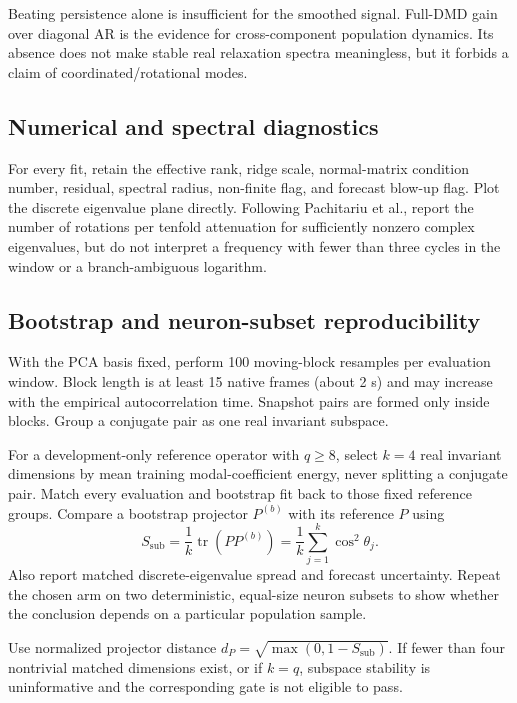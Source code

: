 \documentclass[11pt,a4paper]{article}
\DeclareMathOperator{\tr}{tr}
\begin{document}
Beating persistence alone is insufficient for the smoothed signal. Full-DMD gain
over diagonal AR is the evidence for cross-component population dynamics. Its
absence does not make stable real relaxation spectra meaningless, but it forbids
a claim of coordinated/rotational modes.

\subsection{Numerical and spectral diagnostics}

For every fit, retain the effective rank, ridge scale, normal-matrix condition
number, residual, spectral radius, non-finite flag, and forecast blow-up flag.
Plot the discrete eigenvalue plane directly. Following Pachitariu et al., report
the number of rotations per tenfold attenuation for sufficiently nonzero complex
eigenvalues, but do not interpret a frequency with fewer than three cycles in the
window or a branch-ambiguous logarithm.

\subsection{Bootstrap and neuron-subset reproducibility}

With the PCA basis fixed, perform 100 moving-block resamples per evaluation
window. Block length is at least 15 native frames (about 2 s) and may increase
with the empirical autocorrelation time. Snapshot pairs are formed only inside
blocks. Group a conjugate pair as one real invariant subspace.

For a development-only reference operator with $q\geq8$, select $k=4$ real
invariant dimensions by mean training modal-coefficient energy, never splitting
a conjugate pair. Match every evaluation and bootstrap fit back to those fixed
reference groups. Compare a bootstrap projector $P^{(b)}$ with its reference
$P$ using
\begin{equation}
  S_{\mathrm{sub}}=
  \frac{1}{k}\tr\!\left(PP^{(b)}\right)
  =\frac{1}{k}\sum_{j=1}^{k}\cos^2\theta_j.
\end{equation}
Also report matched discrete-eigenvalue spread and forecast uncertainty. Repeat
the chosen arm on two deterministic, equal-size neuron subsets to show whether
the conclusion depends on a particular population sample.

Use normalized projector distance
$d_P=\sqrt{\max(0,1-S_{\mathrm{sub}})}$. If fewer than four nontrivial matched
dimensions exist, or if $k=q$, subspace stability is uninformative and the
corresponding gate is not eligible to pass.
\end{document}
